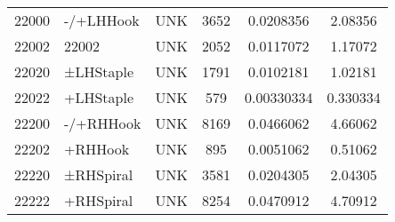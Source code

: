 \documentclass{article}
\begin{document}
\begin{table}
\begin{tabular}{r l l S[table-format=5.0] S[table-format=1.8] S[table-format=2.6]}
22000 & -/+LHHook & UNK & 3652 & 0.0208356 & 2.08356 \\
22002 & 22002 & UNK & 2052 & 0.0117072 & 1.17072 \\
22020 & ±LHStaple & UNK & 1791 & 0.0102181 & 1.02181 \\
22022 & +LHStaple & UNK & 579 & 0.00330334 & 0.330334 \\
22200 & -/+RHHook & UNK & 8169 & 0.0466062 & 4.66062 \\
22202 & +RHHook & UNK & 895 & 0.0051062 & 0.51062 \\
22220 & ±RHSpiral & UNK & 3581 & 0.0204305 & 2.04305 \\
22222 & +RHSpiral & UNK & 8254 & 0.0470912 & 4.70912 \\
\bottomrule
\end{tabular}
\end{table}
\end{document}
